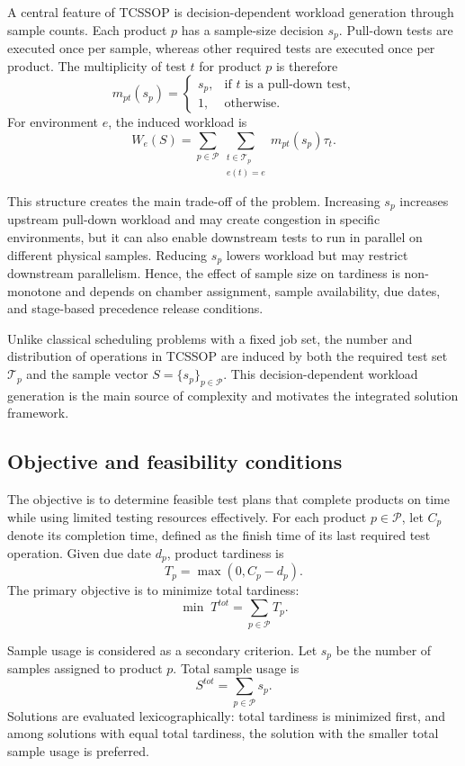 \documentclass[11pt]{article}
\begin{document}
A central feature of TCSSOP is decision-dependent workload generation through sample counts. Each product \(p\) has a sample-size decision \(s_p\). Pull-down tests are executed once per sample, whereas other required tests are executed once per product. The multiplicity of test \(t\) for product \(p\) is therefore
\[
m_{pt}(s_p)=
\left\{
\begin{array}{ll}
s_p, & \text{if } t \text{ is a pull-down test,}\\
1,   & \text{otherwise.}
\end{array}
\right.\]
For environment \(e\), the induced workload is
\[
W_e(S)=
\sum_{p\in\mathcal{P}}
\sum_{\substack{t\in\mathcal{T}_p \\ e(t)=e}}
m_{pt}(s_p)\tau_t.
\]

This structure creates the main trade-off of the problem. Increasing \(s_p\) increases upstream pull-down workload and may create congestion in specific environments, but it can also enable downstream tests to run in parallel on different physical samples. Reducing \(s_p\) lowers workload but may restrict downstream parallelism. Hence, the effect of sample size on tardiness is non-monotone and depends on chamber assignment, sample availability, due dates, and stage-based precedence release conditions.

Unlike classical scheduling problems with a fixed job set, the number and distribution of operations in TCSSOP are induced by both the required test set \(\mathcal{T}_p\) and the sample vector \(S=\{s_p\}_{p\in\mathcal{P}}\). This decision-dependent workload generation is the main source of complexity and motivates the integrated solution framework.

\subsection{Objective and feasibility conditions}
\label{subsec:objective_feasibility}

The objective is to determine feasible test plans that complete products on time while using limited testing resources effectively. For each product \(p\in\mathcal{P}\), let \(C_p\) denote its completion time, defined as the finish time of its last required test operation. Given due date \(d_p\), product tardiness is
\[
T_p=\max(0,C_p-d_p).
\]
The primary objective is to minimize total tardiness:
\[
\min \; T^{tot}=\sum_{p\in\mathcal{P}}T_p.
\]

Sample usage is considered as a secondary criterion. Let \(s_p\) be the number of samples assigned to product \(p\). Total sample usage is
\[
S^{tot}=\sum_{p\in\mathcal{P}}s_p.
\]
Solutions are evaluated lexicographically: total tardiness is minimized first, and among solutions with equal total tardiness, the solution with the smaller total sample usage is preferred.
\end{document}
